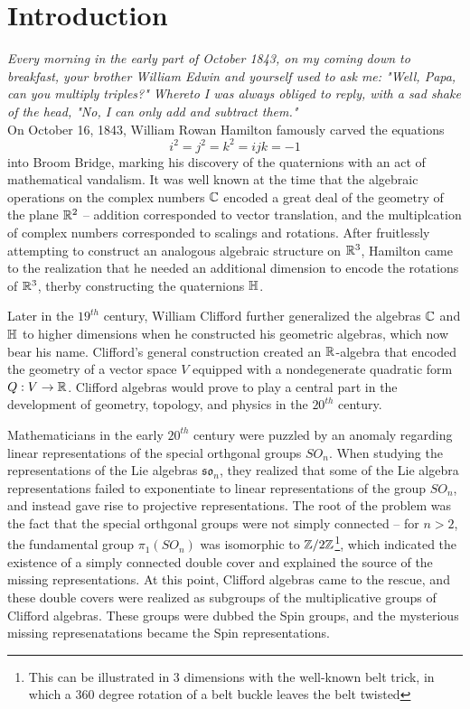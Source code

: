 %
\chapter*{Introduction}
%
\subsectionend $ $\\
\emph{Every morning in the early part of October 1843, on my coming down to
breakfast, your brother William Edwin and yourself used to ask me: "Well,
Papa, can you multiply triples?" Whereto I was always obliged to reply, with a
sad shake of the head, "No, I can only add and subtract them."}\\
%
%
\subsectionend $ $\\
%

On October 16, 1843, William Rowan Hamilton famously carved the equations
\[
i^2 = j^2 = k^2 = ijk = -1
\]
into Broom Bridge, marking his discovery of the quaternions with an act of
mathematical vandalism. It was well known at the time that the algebraic operations
on the complex numbers $\mathbb{C}$ encoded a great deal of the geometry of the plane
$\mathbb{R}^2$ -- addition corresponded to vector translation, and the multiplcation of
complex numbers corresponded to scalings and rotations. After fruitlessly attempting
to construct an analogous algebraic structure on $\mathbb{R}^3$, Hamilton came to the
realization that he needed an additional dimension to encode the rotations
of $\mathbb{R}^3$, therby constructing the quaternions $\mathbb{H}$.

Later in the $19^{th}$ century, William Clifford further generalized the algebras
$\mathbb{C}$ and $\mathbb{H}$ to higher dimensions when he constructed his geometric algebras,
which now bear his name. Clifford's general construction created an $\mathbb{R}$-algebra
that encoded the geometry of a vector space $V$ equipped with a nondegenerate
quadratic form $Q : V \to \mathbb{R}$. Clifford algebras would prove to play a central
part in the development of geometry, topology, and physics in the $20^{th}$
century.

Mathematicians in the early $20^{th}$ century were puzzled by an anomaly
regarding linear representations of the special orthgonal groups $SO_n$.
When studying the representations of the Lie algebras $\mathfrak{so}_n$,
they realized that some of the Lie algebra representations failed to
exponentiate to linear representations of the group $SO_n$, and instead
gave rise to projective representations. The root of the problem was the
fact that the special orthgonal groups were not simply connected --
for $n > 2$, the fundamental group $\pi_1(SO_n)$ was isomorphic to
$\mathbb{Z}/2\mathbb{Z}$\footnote{This can be illustrated in 3 dimensions with the well-known
belt trick, in which a 360 degree rotation of a belt buckle leaves the
belt twisted}, which indicated the existence of a simply connected double cover
and explained the source of the missing representations.
At this point, Clifford algebras came to the rescue, and these double
covers were realized as subgroups of the multiplicative groups of Clifford
algebras. These groups were dubbed the Spin groups, and the mysterious missing
represenatations became the Spin representations.

